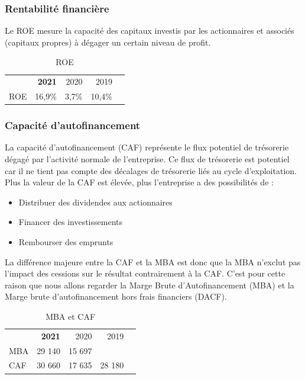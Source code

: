 \documentclass[12pt]{article}
\begin{document}
\subsubsection{Rentabilité financière}
Le ROE mesure la capacité des capitaux investis par les actionnaires et associés (capitaux propres) à 
dégager un certain niveau de profit.
\begin{table}[H]
    \sffamily
    \centering
    \caption{ROE}
    \label{table:ROE}
    \begin{tabular}{l*{1}{rrrr}}
    \toprule
        ~ & \textbf{2021} & 2020 & 2019 \\
    \cmidrule(r){1-1}\cmidrule(r){2-4}
        ROE & 16,9\% & 3,7\% & 10,4\% \\
    \bottomrule
    \end{tabular}
\end{table}
\subsubsection{Capacité d'autofinancement}
La capacité d'autofinancement (CAF) représente le flux potentiel de trésorerie dégagé par l'activité normale de 
l'entreprise. Ce flux de trésorerie est potentiel car il ne tient pas compte des décalages de trésorerie liés au 
cycle d'exploitation. Plus la valeur de la CAF est élevée, plus l'entreprise a des possibilités de : 
\begin{itemize}
    \item Distribuer des dividendes aux actionnaires
    \item Financer des investissements
    \item Rembourser des emprunts
\end{itemize}
La différence majeure entre la CAF et la MBA est donc que la MBA n'exclut pas l'impact des cessions sur le résultat
contrairement à la CAF. C'est pour cette raison que nous allons regarder la Marge Brute d'Autofinancement (MBA) et 
la Marge brute d'autofinancement hors frais financiers (DACF).
\begin{table}[H]
    \sffamily
    \centering
    \caption{MBA et CAF}
    \label{table:CAF}
    \begin{tabular}{l*{1}{rrrr}}
    \toprule
        ~ & \textbf{2021} & 2020 & 2019 \\
    \cmidrule(r){1-1}\cmidrule(r){2-4}
        MBA & 29 140 	& 15 697	& ~ \\
        CAF &  30 660         &   17 635        &   28 180     \\
    \bottomrule
    \end{tabular}
\end{table}
\end{document}
